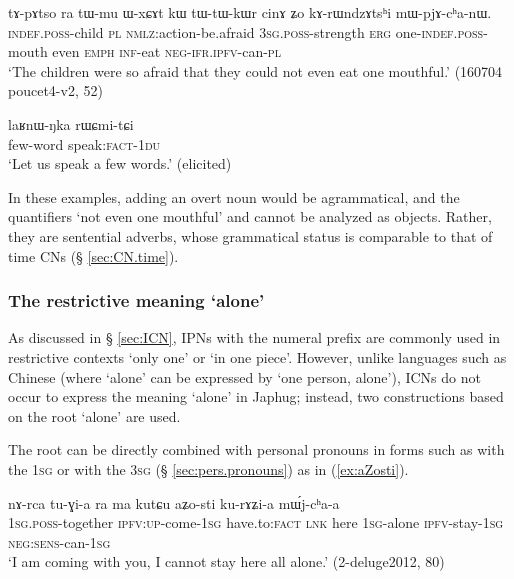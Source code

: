 \begin{exe}
\ex \label{ex:tWtWkWr.cinA}
 \gll tɤ-pɤtso ra tɯ-mu ɯ-xɕɤt kɯ tɯ-tɯ-kɯr cinɤ ʑo kɤ-rɯndzɤtsʰi mɯ-pjɤ-cʰa-nɯ. \\
 \textsc{indef}.\textsc{poss}-child \textsc{pl} \textsc{nmlz}:action-be.afraid \textsc{3sg}.\textsc{poss}-strength \textsc{erg} one-\textsc{indef}.\textsc{poss}-mouth even \textsc{emph} \textsc{inf}-eat \textsc{neg}-\textsc{ifr}.\textsc{ipfv}-can-\textsc{pl} \\
\glt `The children were so afraid that they could not even eat one mouthful.' (160704 poucet4-v2, 52)
\end{exe}

\begin{exe}
\ex \label{ex:laRnWNka.rWCmitCi}
 \gll laʁnɯ-ŋka rɯɕmi-tɕi \\
 few-word speak:\textsc{fact}-\textsc{1du} \\
 \glt `Let us speak a few words.' (elicited)
\end{exe}

In these examples, adding an overt noun would be agrammatical, and the quantifiers  `not even one mouthful' and  cannot be analyzed as objects. Rather, they are sentential adverbs, whose grammatical status is comparable to that of time CNs (§ \ref{sec:CN.time}).

\subsubsection{The restrictive meaning `alone'} \label{sec:stWsti}
As discussed in § \ref{sec:ICN},  IPNs with the numeral prefix  are commonly used in restrictive contexts `only one' or  `in one piece'. However, unlike languages such as Chinese (where  `alone' can be expressed by   `one person, alone'), ICNs do not occur to express the meaning `alone' in Japhug; instead, two constructions based on the root  `alone' are used.

The root  can be directly combined with personal pronouns in forms such as  with the \textsc{1sg}  or  with the \textsc{3sg}   (§ \ref{sec:pers.pronouns}) as in (\ref{ex:aZosti}).

\begin{exe}
\ex \label{ex:aZosti}
 \gll   nɤ-rca tu-ɣi-a ra ma kutɕu aʑo-sti ku-rɤʑi-a mɯ́j-cʰa-a \\
 \textsc{1sg}.\textsc{poss}-together \textsc{ipfv}:\textsc{up}-come-\textsc{1sg} have.to:\textsc{fact} \textsc{lnk} here \textsc{1sg}-alone \textsc{ipfv}-stay-\textsc{1sg} \textsc{neg}:\textsc{sens}-can-\textsc{1sg} \\
\glt `I am coming with you, I cannot stay here all alone.' (2-deluge2012, 80)
\end{exe}

